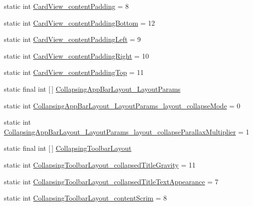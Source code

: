 \begin{DoxyCompactItemize}
\item 
static int \hyperlink{classandroid_1_1support_1_1design_1_1R_1_1styleable_a71511b509dca70524cb9582021ad44a8}{Card\+View\+\_\+content\+Padding} = 8
\item 
static int \hyperlink{classandroid_1_1support_1_1design_1_1R_1_1styleable_aa50ab159eaffa56c7c1179a4bda584fd}{Card\+View\+\_\+content\+Padding\+Bottom} = 12
\item 
static int \hyperlink{classandroid_1_1support_1_1design_1_1R_1_1styleable_a63ea966e86e38f24ab2c64f89934a768}{Card\+View\+\_\+content\+Padding\+Left} = 9
\item 
static int \hyperlink{classandroid_1_1support_1_1design_1_1R_1_1styleable_a07e43115d158fc9a8769282e868714ff}{Card\+View\+\_\+content\+Padding\+Right} = 10
\item 
static int \hyperlink{classandroid_1_1support_1_1design_1_1R_1_1styleable_a3f11c2bc91d13fa21d30841b88ee4b02}{Card\+View\+\_\+content\+Padding\+Top} = 11
\item 
static final int \mbox{[}$\,$\mbox{]} \hyperlink{classandroid_1_1support_1_1design_1_1R_1_1styleable_a84348eab6e616d953feaef19d531ee2f}{Collapsing\+App\+Bar\+Layout\+\_\+\+Layout\+Params}
\item 
static int \hyperlink{classandroid_1_1support_1_1design_1_1R_1_1styleable_a162718a8ab6d2c197efea52ab9dbd5e4}{Collapsing\+App\+Bar\+Layout\+\_\+\+Layout\+Params\+\_\+layout\+\_\+collapse\+Mode} = 0
\item 
static int \hyperlink{classandroid_1_1support_1_1design_1_1R_1_1styleable_a811337664483530d22c06f4cbba2e69c}{Collapsing\+App\+Bar\+Layout\+\_\+\+Layout\+Params\+\_\+layout\+\_\+collapse\+Parallax\+Multiplier} = 1
\item 
static final int \mbox{[}$\,$\mbox{]} \hyperlink{classandroid_1_1support_1_1design_1_1R_1_1styleable_a4a019838b1c3daad84b4ffff397db335}{Collapsing\+Toolbar\+Layout}
\item 
static int \hyperlink{classandroid_1_1support_1_1design_1_1R_1_1styleable_a1873cdd61433f0299df88db2300d219e}{Collapsing\+Toolbar\+Layout\+\_\+collapsed\+Title\+Gravity} = 11
\item 
static int \hyperlink{classandroid_1_1support_1_1design_1_1R_1_1styleable_a86e1c80d3c72a9b5420d66a51d90a49f}{Collapsing\+Toolbar\+Layout\+\_\+collapsed\+Title\+Text\+Appearance} = 7
\item 
static int \hyperlink{classandroid_1_1support_1_1design_1_1R_1_1styleable_aaae4497bf3d18eafeeaff35e11812145}{Collapsing\+Toolbar\+Layout\+\_\+content\+Scrim} = 8

\end{DoxyCompactItemize}
